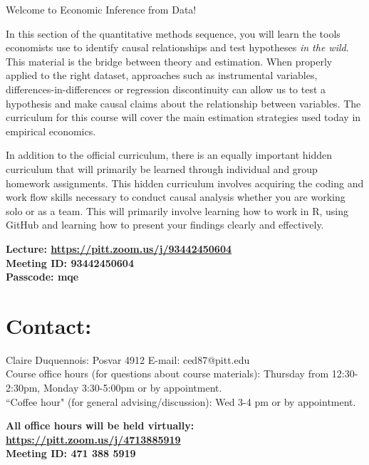 \documentclass[a4paper, 10pt]{article}
\begin{document}
\begin{center}
Welcome to Economic Inference from Data!\\
\end{center}



In this section of the quantitative methods sequence, you will learn the tools economists use to identify causal relationships and test hypotheses \textit{in the wild}. This material is the bridge between theory and estimation. When properly applied to the right dataset, approaches such as instrumental variables, differences-in-differences or regression discontinuity can allow us to test a hypothesis and make causal claims about the relationship between variables. The curriculum for this course will cover the main estimation strategies used today in empirical economics. 

In addition to the official curriculum, there is an equally important hidden curriculum that will primarily be learned through individual and group homework assignments. This hidden curriculum involves acquiring the coding and work flow skills necessary to conduct causal analysis whether you are working solo or as a team. This will primarily involve learning how to work in R, using GitHub and learning how to present your findings clearly and effectively.



\noindent\textbf{Lecture: \href{ https://pitt.zoom.us/j/93442450604}{ https://pitt.zoom.us/j/93442450604}\\
Meeting ID:  93442450604\\
Passcode: mqe\\}


\section*{Contact:}


\normalsize \noindent Claire Duquennois: Posvar 4912  E-mail: ced87@pitt.edu\\
Course office hours (for questions about course materials): Thursday from 12:30-2:30pm,  Monday 3:30-5:00pm or by appointment. \\
``Coffee hour" (for general advising/discussion): Wed 3-4 pm  or by appointment.

\noindent\textbf{All office hours will be held virtually: \href{https://pitt.zoom.us/j/4713885919}{https://pitt.zoom.us/j/4713885919}\\
Meeting ID: 471 388 5919\\}
\end{document}
